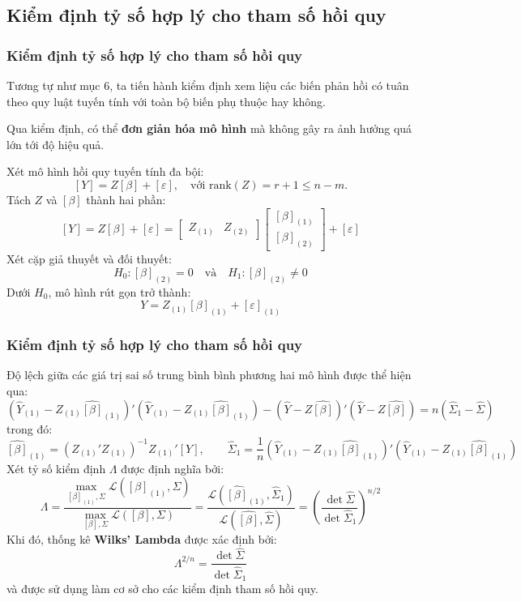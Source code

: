 \subsection{Kiểm định tỷ số hợp lý cho tham số hồi quy}
\begin{frame}
\frametitle{Kiểm định tỷ số hợp lý cho tham số hồi quy}
Tương tự như mục 6, ta tiến hành kiểm định xem liệu các biến phản hồi có tuân theo quy luật tuyến tính với toàn bộ biến phụ thuộc hay không.

Qua kiểm định, có thể \textbf{đơn giản hóa mô hình} mà không gây ra ảnh hưởng quá lớn tới độ hiệu quả.

Xét mô hình hồi quy tuyến tính đa bội:
\[
[Y] = Z[\beta] + [\varepsilon], \quad \text{với } \mathrm{rank}(Z) = r + 1 \le n - m.
\]
Tách $Z$ và $[\beta]$ thành hai phần:
\[
[Y] = Z[\beta] + [\varepsilon]
= \begin{bmatrix} Z_{(1)} & Z_{(2)} \end{bmatrix}
\begin{bmatrix} [\beta]_{(1)} \\ [\beta]_{(2)} \end{bmatrix} + [\varepsilon]
\]
Xét cặp giả thuyết và đối thuyết:
\[
\boxed{
H_0 : [\beta]_{(2)} = 0
\quad \text{và} \quad
H_1 : [\beta]_{(2)} \neq 0
}
\]
Dưới $H_0$, mô hình rút gọn trở thành:
\[
Y = Z_{(1)}[\beta]_{(1)} + [\varepsilon]_{(1)}
\]
\end{frame}

\begin{frame}
\frametitle{Kiểm định tỷ số hợp lý cho tham số hồi quy}
Độ lệch giữa các giá trị sai số trung bình bình phương hai mô hình được thể hiện qua:
\[
(\widehat{Y}_{(1)} - Z_{(1)}\widehat{[\beta]}_{(1)})'(\widehat{Y}_{(1)} - Z_{(1)}\widehat{[\beta]}_{(1)})
- (\widehat{Y} - Z\widehat{[\beta]})'(\widehat{Y} - Z\widehat{[\beta]})
= n(\widehat{\Sigma}_1 - \widehat{\Sigma})
\]
trong đó:
\[
\widehat{[\beta]}_{(1)} = (Z_{(1)}'Z_{(1)})^{-1}Z_{(1)}'[Y], 
\qquad 
\widehat{\Sigma}_1 = \frac{1}{n}(\widehat{Y}_{(1)} - Z_{(1)}\widehat{[\beta]}_{(1)})'(\widehat{Y}_{(1)} - Z_{(1)}\widehat{[\beta]}_{(1)})
\]
Xét tỷ số kiểm định $\Lambda$ được định nghĩa bởi:
\[
\Lambda = 
\frac{\max_{[\beta]_{(1)}, \Sigma} \mathcal{L}([\beta]_{(1)}, \Sigma)}
{\max_{[\beta], \Sigma} \mathcal{L}([\beta], \Sigma)}
= \frac{\mathcal{L}(\widehat{[\beta]}_{(1)}, \widehat{\Sigma}_1)}{\mathcal{L}(\widehat{[\beta]}, \widehat{\Sigma})}
= \left(\frac{\det \widehat{\Sigma}}{\det \widehat{\Sigma}_1}\right)^{n/2}
\]
Khi đó, thống kê \textbf{Wilks' Lambda} được xác định bởi:
\[
\boxed{
\Lambda^{2/n} = \frac{\det \widehat{\Sigma}}{\det \widehat{\Sigma}_1}
}
\]
và được sử dụng làm cơ sở cho các kiểm định tham số hồi quy.
\end{frame}

